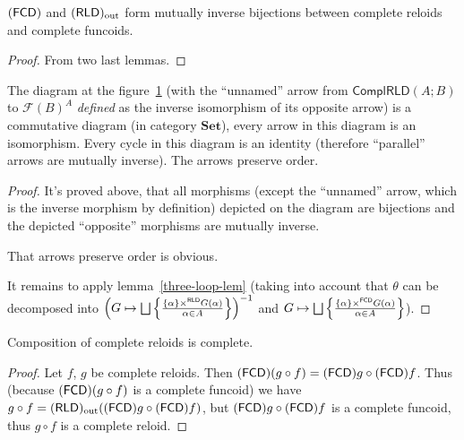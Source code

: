 \begin{prop}
$(\mathsf{FCD})$ and $(\mathsf{RLD})_{\mathrm{out}}$ form mutually inverse bijections between
complete reloids and complete funcoids.\end{prop}
\begin{proof}
From two last lemmas.\end{proof}
\begin{thm}
The diagram at the figure~\ref{cmpl-dia} (with the ``unnamed''
arrow from $\mathsf{ComplRLD}(A;B)$ to $\mathscr{F}(B)^A$ \emph{defined} as the inverse isomorphism of its opposite arrow)
is a commutative diagram (in category $\mathbf{Set}$), every arrow
in this diagram is an isomorphism. Every cycle in this diagram is
an identity (therefore ``parallel'' arrows are mutually inverse).
The arrows preserve order.

\begin{figure}[ht]
\caption{\label{cmpl-dia}}


\end{figure}
\end{thm}
\begin{proof}
It's proved above, that all morphisms (except the ``unnamed'' arrow,
which is the inverse morphism by definition) depicted on the diagram
are bijections and the depicted ``opposite'' morphisms are mutually
inverse.

That arrows preserve order is obvious.

It remains to apply lemma~\ref{three-loop-lem} (taking into account
that $\theta$ can be decomposed into $\left(G\mapsto\bigsqcup\setcond{\{\alpha\}\times^{\mathsf{RLD}}G(\alpha)}{\alpha\in A}\right)^{-1}$
and $G\mapsto\bigsqcup\setcond{\{\alpha\}\times^{\mathsf{FCD}}G(\alpha)}{\alpha\in A}$).\end{proof}
\begin{thm}
Composition of complete reloids is complete.\end{thm}
\begin{proof}
Let $f$, $g$ be complete reloids. Then $(\mathsf{FCD})(g\circ f)=(\mathsf{FCD}) g\circ(\mathsf{FCD}) f$.
Thus (because $(\mathsf{FCD})(g\circ f)$ is a complete funcoid) we have $g\circ f=(\mathsf{RLD})_{\mathrm{out}}((\mathsf{FCD}) g\circ(\mathsf{FCD}) f)$,
but $(\mathsf{FCD}) g\circ(\mathsf{FCD}) f$ is a complete funcoid, thus $g\circ f$
is a complete reloid.\end{proof}
